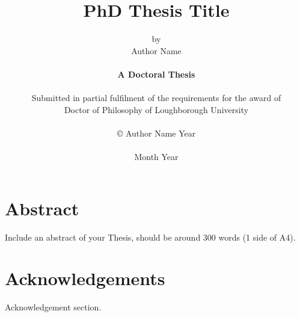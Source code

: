 \title{PhD Thesis Title}

\author{by\\Author Name\\
\\
{\bf A Doctoral Thesis}\\
\\
Submitted in partial fulfilment of the requirements for the award of\\
Doctor of Philosophy of Loughborough University\\
\\
\copyright
\hspace{1 dd} Author Name Year\\
\\
Month Year
}
\date{} %

\maketitle





\chapter*{Abstract}
Include an abstract of your Thesis, should be around 300 words (1 side of A4).

\chapter*{Acknowledgements}
Acknowledgement section.

\setcounter{tocdepth}{2}
\tableofcontents

\listoffigures

\listoftables


\newpage

